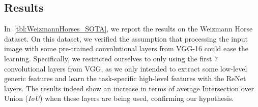 %


%

\subsection{Results}

In~\autoref{tbl:WeizmannHorses_SOTA}, we report the results on the Weizmann
Horse dataset. On this dataset, we verified the assumption that processing
the input image with some pre-trained convolutional layers from VGG-16 could
ease the learning. Specifically, we restricted ourselves to only using the
first $7$ convolutional layers from VGG, as we only intended to extract some
low-level generic features and learn the task-specific high-level features with
the ReNet layers. The results indeed show an increase in terms of average Intersection
over Union (\emph{IoU}) when these layers are being used, confirming our
hypothesis.

